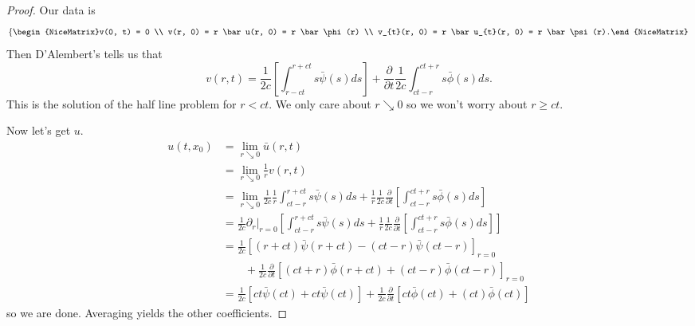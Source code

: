 \begin{proof}
	Our data is
	\[ \left\{\begin{NiceMatrix}v(0, t) = 0 \\ v(r, 0) = r \bar u(r, 0) = r \bar \phi(r) \\ v_{t}(r, 0) = r \bar u_{t}(r, 0) = r \bar \psi(r).\end{NiceMatrix}\right.  \]
	Then D'Alembert's tells us that
	\[ v(r, t) = \frac{1}{2c} \left[ \int_{r - ct}^{r + ct} s \bar \psi(s) ds \right] + \frac{\partial}{\partial t} \frac{1}{2c}\int_{ct - r}^{ct + r} s \bar \phi(s) ds.  \]
	This is the solution of the half line problem for \( r < ct \). We only care about \( r \searrow 0 \) so we won't worry about \( r \ge ct \). 

	Now let's get \( u \). 
	\begin{align*}
		u(t, x_{0}) &= \lim_{r \searrow 0} \bar u(r, t)\\
							 &= \lim_{r \searrow 0}\frac{1}{r} v(r, t) \\
							 &= \lim_{r \searrow 0} \frac{1}{2 c} \frac{1}{r} \int_{ct - r}^{r + ct} s \bar \psi(s) ds + \frac{1}{r} \frac{1}{2 c} \frac{\partial}{\partial t} \left[ \int_{ct - r}^{ct + r} s \bar \phi(s) ds \right] \\
							 &= \frac{1}{2 c} \left.\partial_{r} \right|_{r = 0}\left[ \int_{ct - r}^{r + ct} s \bar \psi(s) ds + \frac{1}{r} \frac{1}{2 c} \frac{\partial}{\partial t} \left[ \int_{ct - r}^{ct + r} s \bar \phi(s) ds \right] \right] \\
							 &= \frac{1}{2 c} \left[ (r + ct) \bar \psi(r + ct) - (ct - r) \bar \psi(ct - r) \right]_{r = 0} \\ 
							 &\qquad+ \frac{1}{2c} \frac{\partial}{\partial t} \left[ (ct+r) \bar \phi(r + ct) + (ct - r) \bar \phi(ct -r) \right]_{r = 0}  \\
							 &= \frac{1}{2 c} \left[ ct \bar \psi(ct) +ct \bar \psi(ct) \right] + \frac{1}{2c} \frac{\partial}{\partial t} \left[ ct \bar \phi(ct) + (ct) \bar \phi(ct) \right]  
	\end{align*}
	so we are done. Averaging yields the other coefficients.
\end{proof}
